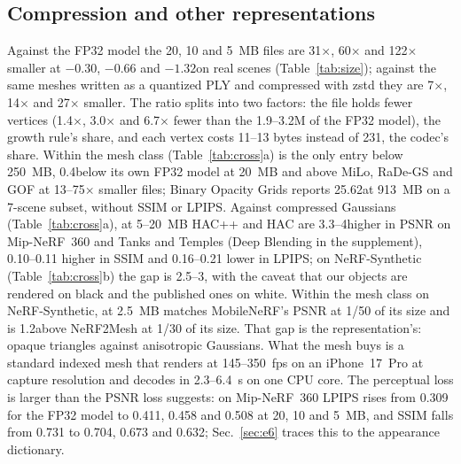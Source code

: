 \subsection{Compression and other representations}
\label{sec:e4}
Against the FP32 model the 20, 10 and 5~MB files are 31$\times$, 60$\times$ and 122$\times$ smaller at $-0.30$, $-0.66$ and $-1.32$\dB on real scenes (Table~\ref{tab:size}); against the same meshes written as a quantized PLY and compressed with zstd they are 7$\times$, 14$\times$ and 27$\times$ smaller. The ratio splits into two factors: the file holds fewer vertices (1.4$\times$, 3.0$\times$ and 6.7$\times$ fewer than the 1.9--3.2M of the FP32 model), the growth rule's share, and each vertex costs 11--13 bytes instead of 231, the codec's share. Within the mesh class (Table~\ref{tab:cross}a) \BM is the only entry below 250~MB, 0.4\dB below its own FP32 model at 20~MB and above MiLo, RaDe-GS and GOF at 13--75$\times$ smaller files; Binary Opacity Grids reports 25.62\dB at 913~MB on a 7-scene subset, without SSIM or LPIPS. Against compressed Gaussians (Table~\ref{tab:cross}a), at 5--20~MB HAC++ and HAC are 3.3--4\dB higher in PSNR on Mip-NeRF~360 and Tanks and Temples (Deep Blending in the supplement), 0.10--0.11 higher in SSIM and 0.16--0.21 lower in LPIPS; on NeRF-Synthetic (Table~\ref{tab:cross}b) the gap is 2.5--3\dB, with the caveat that our objects are rendered on black and the published ones on white. Within the mesh class on NeRF-Synthetic, \BM at 2.5~MB matches MobileNeRF's PSNR at 1/50 of its size and is 1.2\dB above NeRF2Mesh at 1/30 of its size. That gap is the representation's: opaque triangles against anisotropic Gaussians. What the mesh buys is a standard indexed mesh that renders at 145--350~fps on an iPhone~17~Pro at capture resolution and decodes in 2.3--6.4~s on one CPU core. The perceptual loss is larger than the PSNR loss suggests: on Mip-NeRF~360 LPIPS rises from 0.309 for the FP32 model to 0.411, 0.458 and 0.508 at 20, 10 and 5~MB, and SSIM falls from 0.731 to 0.704, 0.673 and 0.632; Sec.~\ref{sec:e6} traces this to the appearance dictionary.


